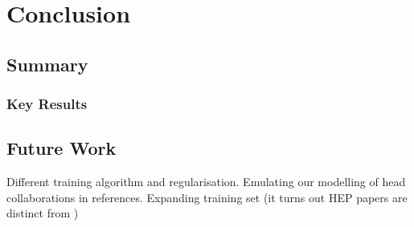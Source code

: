
\chapter{Conclusion} %

\label{Chapter6} %



\section{Summary}
\subsection{Key Results}
\section{Future Work}

Different training algorithm and regularisation.
Emulating our modelling of head collaborations in references.
Expanding training set (it turns out HEP papers are distinct from )

\label{sec:futurework}
